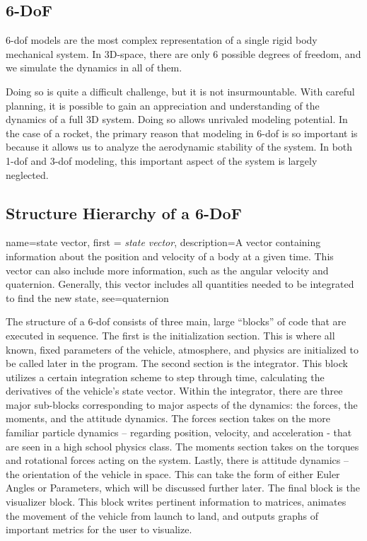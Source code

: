 \documentclass[12pt]{report}
\begin{document}
\subsection{6-DoF}
6-\gls{dof} models are the most complex representation of a single rigid body mechanical system. In 3D-space, there are only 6 possible degrees of freedom, and we simulate the dynamics in all of them.

Doing so is quite a difficult challenge, but it is not insurmountable. With careful planning, it is possible to gain an appreciation and understanding of the dynamics of a full 3D system. Doing so allows unrivaled modeling potential. In the case of a rocket, the primary reason that modeling in 6-\gls{dof} is so important is because it allows us to analyze the aerodynamic stability of the system. In both 1-\gls{dof} and 3-\gls{dof} modeling, this important aspect of the system is largely neglected.
\subsection{Structure Hierarchy of a 6-DoF}

{
    name=state vector,
    first = {\textit{state vector}},
    description={A vector containing information about the position and velocity of a body at a given time. This vector can also include more information, such as the angular velocity and quaternion. Generally, this vector includes all quantities needed to be integrated to find the new state},
    see={quaternion}
}

The structure of a 6-\gls{dof} consists of three main, large “blocks” of code that are executed in sequence. The first is the initialization section. This is where all known, fixed parameters of the vehicle, atmosphere, and physics are initialized to be called later in the program. The second section is the integrator. This block utilizes a certain integration scheme to step through time, calculating the derivatives of the vehicle’s \gls{state vector}. Within the integrator, there are three major sub-blocks corresponding to major aspects of the dynamics: the forces, the moments, and the attitude dynamics. The forces section takes on the more familiar particle dynamics – regarding position, velocity, and acceleration - that are seen in a high school physics class. The moments section takes on the torques and rotational forces acting on the system. Lastly, there is  attitude dynamics – the orientation of the vehicle in space. This can take the form of either Euler Angles or Parameters, which will be discussed further later. The final block is the visualizer block. This block writes pertinent information to matrices, animates the movement of the vehicle from launch to land, and outputs graphs of important metrics for the user to visualize.
\end{document}

